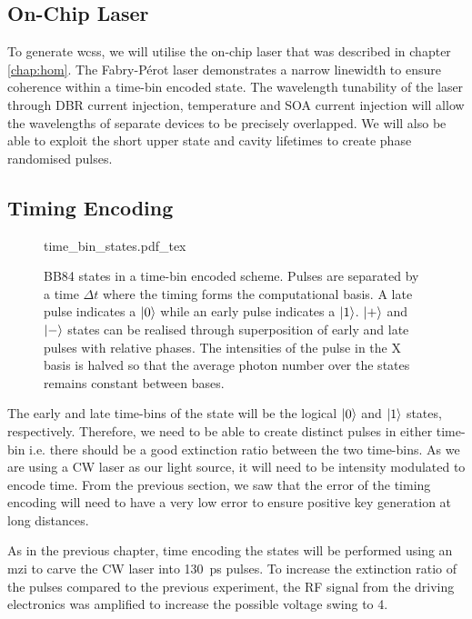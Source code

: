 \subsection{On-Chip Laser}

To generate \acp{wcs}, we will utilise the on-chip laser that was described in chapter \ref{chap:hom}. The Fabry-P\'{e}rot laser demonstrates a narrow linewidth to ensure coherence within a time-bin encoded state. The wavelength tunability of the laser through \ac{DBR} current injection, temperature and \ac{SOA} current injection will allow the wavelengths of separate devices to be precisely overlapped. We will also be able to exploit the short upper state and cavity lifetimes to create phase randomised pulses.

\subsection{Timing Encoding}

\begin{figure}[t]
	\centering
	\small
	\def\svgwidth{0.9\textwidth} 
	{time_bin_states.pdf_tex}
	\caption[BB84 time-bin encoding]{BB84 states in a time-bin encoded scheme. Pulses are separated by a time $\Delta t$ where the timing forms the computational basis. A late pulse indicates a $\ket{0}$ while an early pulse indicates a $\ket{1}$. $\ket{+}$ and $\ket{-}$ states can be realised through superposition of early and late pulses with relative phases. The intensities of the pulse in the X basis is halved so that the average photon number over the states remains constant between bases.}
	\label{fig:BB84_time_bin}
\end{figure}

The early and late time-bins of the state will be the logical $\ket{0}$ and $\ket{1}$ states, respectively. Therefore, we need to be able to create distinct pulses in either time-bin i.e. there should be a good extinction ratio between the two time-bins. As we are using a \ac{CW} laser as our light source, it will need to be intensity modulated to encode time. From the previous section, we saw that the error of the timing encoding will need to have a very low error to ensure positive key generation at long distances.

As in the previous chapter, time encoding the states will be performed using an \acl{mzi} to carve the \ac{CW} laser into \SI{130}{ps} pulses. To increase the extinction ratio of the pulses compared to the previous experiment, the RF signal from the driving electronics was amplified to increase the possible voltage swing to \SI{4}{\Vpp}. 

